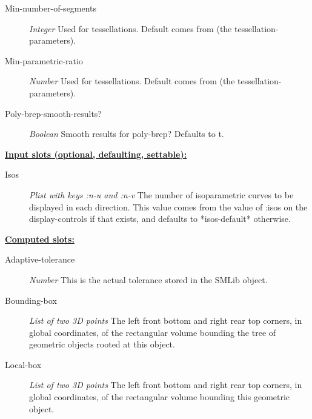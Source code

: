\documentclass [11pt]{book}
\begin{document}
\begin{itemize}
\begin{description}
\item [Min-number-of-segments]
\emph{Integer} Used for tessellations. Default comes from (the tessellation-parameters).


\item [Min-parametric-ratio]
\emph{Number} Used for tessellations. Default comes from (the tessellation-parameters).


\item [Poly-brep-smooth-results?]
\emph{Boolean} Smooth results for poly-brep? Defaults to t.


\end{description}






\textbf{
\underline{Input slots (optional, defaulting, settable):}}

\begin{description}

\item [Isos]
\emph{Plist with keys :n-u and :n-v} The number of isoparametric curves to be displayed in each direction.
This value comes from the value of :isos on the display-controls if that exists, and defaults
to *isos-default* otherwise.


\end{description}






\textbf{
\underline{Computed slots:}}

\begin{description}

\item [Adaptive-tolerance]
\emph{Number} This is the actual tolerance stored in the SMLib object.


\item [Bounding-box]
\emph{List of two 3D points} The left front bottom and right rear top corners, in global coordinates,
of the rectangular volume bounding the tree of geometric objects rooted at this object.


\item [Local-box]
\emph{List of two 3D points} The left front bottom and right rear top corners, in global coordinates,
of the rectangular volume bounding this geometric object.



\end{description}
\end{itemize}
\end{document}

